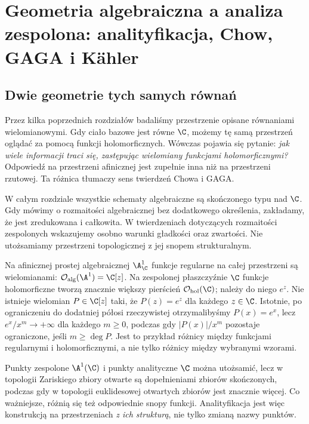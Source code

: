 \chapter{Geometria algebraiczna a analiza zespolona: analityfikacja, Chow, GAGA i Kähler}
\label{ch:ga9-analiza-zespolona}

\providecommand{\atlasref}[2]{#2}


\section{Dwie geometrie tych samych równań}
\label{sec:ga9-motywacja}

Przez kilka poprzednich rozdziałów badaliśmy przestrzenie opisane równaniami
wielomianowymi. Gdy ciało bazowe jest równe $\C$, możemy tę samą przestrzeń
oglądać za pomocą funkcji holomorficznych. Wówczas pojawia się pytanie:
\emph{jak wiele informacji traci się, zastępując wielomiany funkcjami
holomorficznymi?} Odpowiedź na przestrzeni afinicznej jest zupełnie inna niż
na przestrzeni rzutowej. Ta różnica tłumaczy sens twierdzeń Chowa i GAGA.

W całym rozdziale wszystkie schematy algebraiczne są skończonego typu nad
$\C$. Gdy mówimy o rozmaitości algebraicznej bez dodatkowego określenia,
zakładamy, że jest zredukowana i całkowita. W twierdzeniach dotyczących
rozmaitości zespolonych wskazujemy osobno warunki gładkości oraz zwartości.
Nie utożsamiamy przestrzeni topologicznej z jej snopem strukturalnym.

\begin{przyklad}
Na afinicznej prostej algebraicznej $\A^1_\C$ funkcje regularne na całej
przestrzeni są wielomianami: $\mathcal O_{\rm alg}(\A^1)=\C[z]$.
Na zespolonej płaszczyźnie $\C$ funkcje holomorficzne tworzą znacznie
większy pierścień $\mathcal O_{\rm hol}(\C)$; należy do niego $e^z$.
Nie istnieje wielomian $P\in\C[z]$ taki, że $P(z)=e^z$ dla każdego
$z\in\C$. Istotnie, po ograniczeniu do dodatniej półosi rzeczywistej
otrzymalibyśmy $P(x)=e^x$, lecz $e^x/x^m\to+\infty$ dla każdego
$m\ge0$, podczas gdy $|P(x)|/x^m$ pozostaje ograniczone, jeśli
$m\ge\deg P$. Jest to przykład różnicy między funkcjami regularnymi
i holomorficznymi, a nie tylko różnicy między wybranymi wzorami.
\end{przyklad}

\begin{uwaga}
Punkty zespolone $\A^1(\C)$ i punkty analityczne $\C$ można utożsamić,
lecz w topologii Zariskiego zbiory otwarte są dopełnieniami zbiorów
skończonych, podczas gdy w topologii euklidesowej otwartych zbiorów jest
znacznie więcej. Co ważniejsze, różnią się też odpowiednie snopy
funkcji. Analityfikacja jest więc konstrukcją na przestrzeniach
\emph{z ich strukturą}, nie tylko zmianą nazwy punktów.
\end{uwaga}

